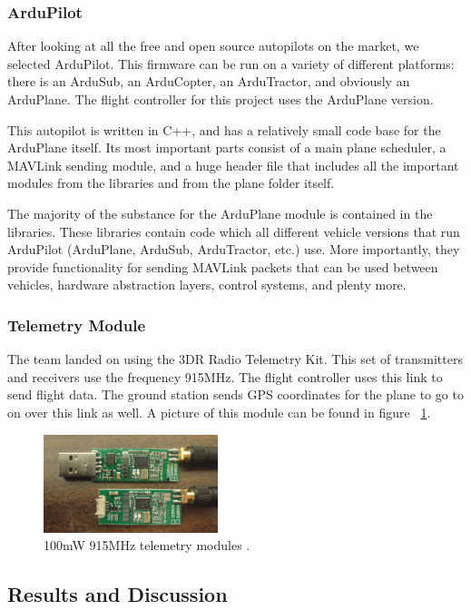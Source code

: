 \documentclass[12pt,journal,compsoc]{IEEEtran}
\begin{document}
\subsubsection{ArduPilot}
After looking at all the free and open source autopilots on the market, we selected ArduPilot. This firmware can be run on a variety of different platforms: there is an ArduSub, an ArduCopter, an ArduTractor, and obviously an ArduPlane. The flight controller for this project uses the ArduPlane version. 

This autopilot is written in C++, and has a relatively small code base for the ArduPlane itself. Its most important parts consist of a main plane scheduler, a MAVLink sending module, and a huge header file that includes all the important modules from the libraries and from the plane folder itself. 

The majority of the substance for the ArduPlane module is contained in the libraries. These libraries contain code which all different vehicle versions that run ArduPilot (ArduPlane, ArduSub, ArduTractor, etc.) use. More importantly, they provide functionality for sending MAVLink packets that can be used between vehicles, hardware abstraction layers, control systems, and plenty more. 

\subsubsection{Telemetry Module}
The team landed on using the 3DR Radio Telemetry Kit. This set of transmitters and receivers use the frequency 915MHz. The flight controller uses this link to send flight data. The ground station sends GPS coordinates for the plane to go to on over this link as well. A picture of this module can be found in figure ~\ref{mavStruct}.

\begin{figure}[h!]
\hspace*{0cm}
\centering
\includegraphics[width=2in]{telem.jpg}
\caption{100mW 915MHz telemetry modules \cite{telemModule}.}
\label{mavStruct}
\end{figure}

\subsection{Results and Discussion}
\end{document}
